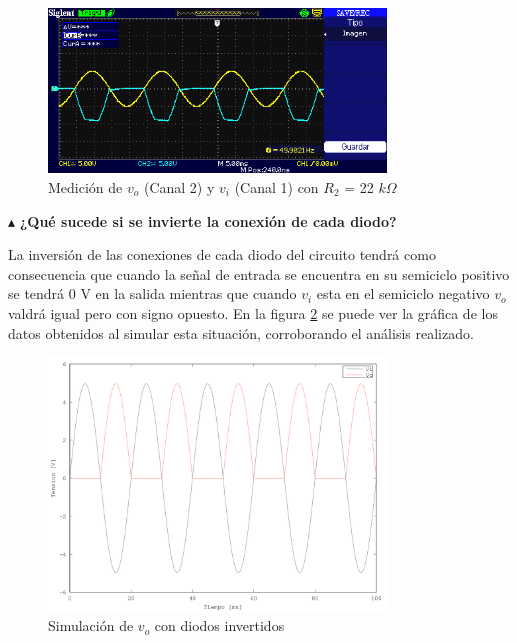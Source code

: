\begin{figure}[H]
  \centering
      \includegraphics[width=0.8\textwidth]{gfxsantiago/FIG_MED_Rectificador_Precision_4C.png}
  \caption{Medición de $v_{o}$ (Canal 2) y $v_{i}$ (Canal 1) con $R_{2}$ = 22 $k\Omega$}
  \label{fig:med_4C}
\end{figure}

\noindent$\blacktriangle$\textbf{ ¿Qué sucede si se invierte la conexión de cada diodo?}

La inversión de las conexiones de cada diodo del circuito tendrá como consecuencia que cuando la señal de entrada se encuentra en su semiciclo positivo se tendrá 0 V en la salida mientras que cuando $v_{i}$ esta en el semiciclo negativo $v_{o}$ valdrá igual pero con signo opuesto. En la figura \ref{fig:sim_4D} se puede ver la gráfica de los datos obtenidos al simular esta situación, corroborando el análisis realizado.

\begin{figure}[H]
  \centering
      \includegraphics[width=0.8\textwidth]{gfxsantiago/FIG_SIM_Rectificador_Precision_4D.png}
  \caption{Simulación de $v_{o}$ con diodos invertidos}
  \label{fig:sim_4D}
\end{figure}
